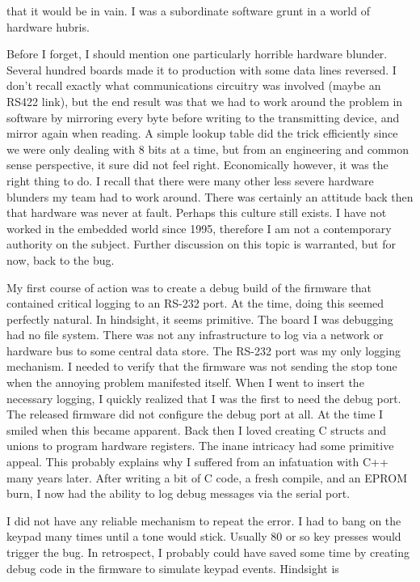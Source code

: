 that it would be in vain. I was a subordinate software grunt in a world of
hardware hubris.
\par
Before I forget, I should mention one particularly horrible hardware blunder.
Several hundred boards made it to production with some data lines reversed. I
don't recall exactly what communications circuitry was involved (maybe an RS422
link), but the end result was that we had to work around the problem in software
by mirroring every byte before writing to the transmitting device, and mirror
again when reading. A simple lookup table did the trick efficiently since we
were only dealing with 8 bits at a time, but from an engineering and common
sense perspective, it sure did not feel right. Economically however, it was the
right thing to do. I recall that there were many other less severe hardware
blunders my team had to work around. There was certainly an attitude back then
that hardware was never at fault. Perhaps this culture still exists. I have not
worked in the embedded world since 1995, therefore I am not a contemporary
authority on the subject. Further discussion on this topic is warranted, but for
now, back to the bug.
\par
My first course of action was to create a debug build of the firmware that
contained critical logging to an RS-232 port. At the time, doing this seemed
perfectly natural. In hindsight, it seems primitive. The board I was debugging
had no file system. There was not any infrastructure to log via a network or
hardware bus to some central data store. The RS-232 port was my only logging
mechanism. I needed to verify that the firmware was not sending the stop tone
when the annoying problem manifested itself. When I went to insert the necessary
logging, I quickly realized that I was the first to need the debug port. The
released firmware did not configure the debug port at all. At the time I smiled
when this became apparent. Back then I loved creating C structs and unions to
program hardware registers. The inane intricacy had some primitive appeal. This
probably explains why I suffered from an infatuation with C++ many years later.
After writing a bit of C code, a fresh compile, and an EPROM burn, I now had the
ability to log debug messages via the serial port.
\par
I did not have any reliable mechanism to repeat the error. I had to bang on the
keypad many times until a tone would stick. Usually 80 or so key presses would
trigger the bug. In retrospect, I probably could have saved some time by
creating debug code in the firmware to simulate keypad events. Hindsight is
